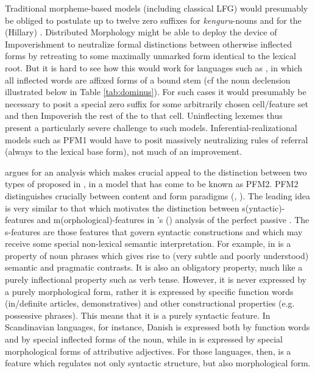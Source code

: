 \documentclass[output=paper,colorlinks,citecolor=brown]{langscibook}
\begin{document}
\sloppy
Traditional morpheme-based models (including classical LFG)  would  presumably be obliged to postulate up to twelve zero suffixes for \textit{kenguru}-nouns and for the  (Hillary) . Distributed Morphology \citep{embick2015} might be able to deploy the device of Impoverishment to neutralize formal distinctions between otherwise inflected forms by retreating to some maximally unmarked form identical to the lexical root. But it is hard to see how this would work for languages such as , in which all inflected words are affixed forms of a bound stem (cf  the  noun declension illustrated below in Table \ref{tab:dominus}). For such cases it would presumably be necessary to posit a special zero suffix for some arbitrarily chosen cell/feature set and then Impoverish the rest of the  to that cell. Uninflecting lexemes thus present a particularly severe challenge to such models. Inferential-realizational models such as PFM1 \citet{stump2001} would have to posit massively neutralizing rules of referral (always to the lexical base form), not  much of an improvement. 

\citet{spencer2020} argues for an analysis which makes crucial appeal to  the distinction between two types  of  proposed in \citet{stump2016}, in a model that has come to be known as PFM2. PFM2 distinguishes crucially between content and form paradigms (\PC, \PF).  %
The leading idea is very similar to that which motivates the distinction between s(yntactic)-features and m(orphological)-features in \citeauthor{sadlerspencer2001}'s (\citeyear{sadlerspencer2001}) analysis of the  perfect passive . The s-features are those features that govern syntactic constructions and which may receive some special non-lexical semantic interpretation. For example, in   is a  property of noun phrases which gives rise to (very subtle and poorly understood) semantic and pragmatic contrasts. It is also an obligatory property, much like a purely inflectional property such as verb tense. However, it is never expressed by a purely morphological form, rather it is expressed by specific function words (in/definite articles, demonstratives) and other constructional properties (e.g. possessive phrases). This means that it is a purely syntactic feature. In Scandinavian languages, for instance, Danish \citep{lundskaernielsenholmes2015}  is expressed both by function words and by special inflected forms of the noun, while in  \citep{kalnacalokmane2021}  is expressed by special morphological forms of attributive adjectives. For those languages, then,  is a feature which regulates not only syntactic structure, but also morphological form.  
\end{document}

